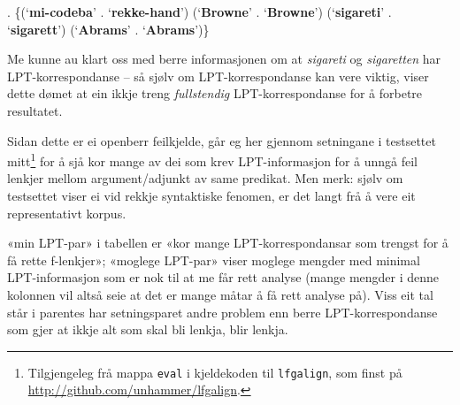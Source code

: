 \documentclass[11pt,a4paper,oneside,draft]{book}
\newcommand{\p}[1]{`\textbf{#1}'}
\begin{document}
\ex. \{(\p{mi-codeba} . \p{rekke-hand})
 (\p{Browne} . \p{Browne}) (\p{sigareti} . \p{sigarett}) (\p{Abrams} . \p{Abrams})\}

 Me kunne au klart oss med berre informasjonen om at \emph{sigareti} og
 \emph{sigaretten} har LPT-korrespondanse -- så sjølv om LPT-korrespondanse
 kan vere viktig, viser dette dømet at ein ikkje treng \emph{fullstendig}
 LPT-korrespondanse for å forbetre resultatet.

 Sidan dette er ei openberr feilkjelde, går eg her gjennom setningane
 i testsettet mitt\footnote{Tilgjengeleg frå mappa \texttt{eval} i kjeldekoden til \texttt{lfgalign},
        som finst på \href{http://github.com/unhammer/lfgalign}{http://github.com/unhammer/lfgalign}. } for å sjå kor mange av dei som krev
 LPT-informasjon for å unngå feil lenkjer mellom argument/adjunkt av
 same predikat. Men merk: sjølv om testsettet viser ei vid rekkje
 syntaktiske fenomen, er det langt frå å vere eit representativt
 korpus.

 «min LPT-par» i tabellen er «kor mange LPT-korrespondansar som
 trengst for å få rette f-lenkjer»; «moglege LPT-par» viser moglege
 mengder med minimal LPT-informasjon som er nok til at me får rett
 analyse (mange mengder i denne kolonnen vil altså seie at det er
 mange måtar å få rett analyse på). Viss eit tal står i parentes har
 setningsparet andre problem enn berre LPT-korrespondanse som gjer at
 ikkje alt som skal bli lenkja, blir lenkja.
\end{document}
